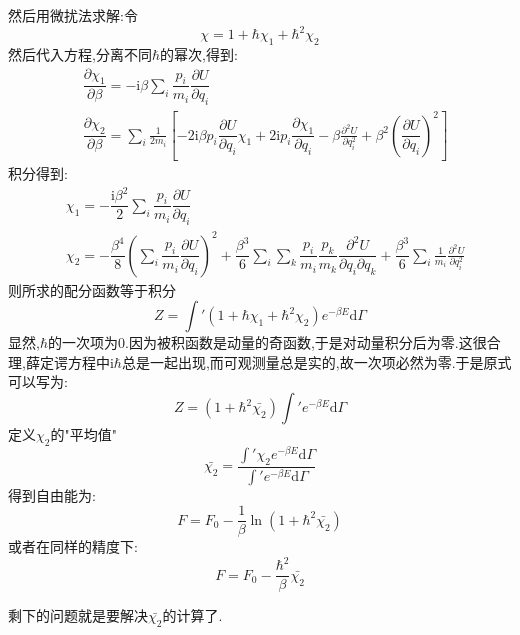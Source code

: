 然后用微扰法求解:令
\begin{equation}
  \chi=1+\hbar\chi_1+\hbar^{2}\chi_2
\end{equation}
然后代入方程,分离不同$\hbar$的幂次,得到:
\begin{align}
&\dfrac{\partial \chi_1}{\partial \beta}=-\mathrm{i} \beta\sum_i \dfrac{p_i}{m_i}\dfrac{\partial U}{\partial q_i} \\ 
&\dfrac{\partial \chi_2}{\partial \beta}=\sum_i \frac{1}{2m_i}\left[ -2\mathrm{i} \beta p_i \dfrac{\partial U}{\partial q_i}\chi_1+2\mathrm{i} p_i \dfrac{\partial \chi_1}{\partial q_i}-\beta \frac{\partial^2 U}{\partial q_i^2}+\beta^{2} \left( \dfrac{\partial U}{\partial q_i} \right) ^{2} \right]
\end{align}
积分得到:
\begin{align}
&\chi_1=-\dfrac{\mathrm{i} \beta^{2}}{2}\sum_i \dfrac{p_i}{m_i}\dfrac{\partial U}{\partial q_i} \\ 
&\chi_2=-\dfrac{\beta^{4}}{8}\left( \sum_i \dfrac{p_i}{m_i}\dfrac{\partial U}{\partial q_i}
 \right) ^{2}+\dfrac{\beta^{3}}{6}\sum_i \sum_k \dfrac{p_i}{m_i}\dfrac{p_k}{m_k}\dfrac{\partial^{2} U}{\partial q_i \partial q_k}+\dfrac{\beta^{3}}{6}\sum_i \frac{1}{m_i} \frac{\partial^2 U}{\partial q_i^2}
\end{align}
则所求的配分函数等于积分
\begin{equation}
  Z=\int'(1+\hbar \chi_1+\hbar^{2}\chi_2)e^{-\beta E}\mathrm{d} \Gamma
\end{equation}
显然,$\hbar$的一次项为0.因为被积函数是动量的奇函数,于是对动量积分后为零.这很合理,薛定谔方程中$\mathrm{i} \hbar$总是一起出现,而可观测量总是实的,故一次项必然为零.于是原式可以写为:
\begin{equation}
  Z=(1+\hbar^{2}\bar{\chi_2})\int' e^{-\beta E}\mathrm{d} \Gamma
\end{equation}
定义$\chi_2$的"平均值"
\[\bar{\chi_2}=\dfrac{\int'\chi_2 e^{-\beta E}\mathrm{d} \Gamma}{\int' e^{-\beta E}\mathrm{d} \Gamma}\]
得到自由能为:
\begin{equation}
  F=F_0-\frac{1}{\beta}\ln(1+\hbar^{2}\bar{\chi_2})
\end{equation}
或者在同样的精度下:
\begin{equation}
  F=F_0-\dfrac{\hbar^{2}}{\beta}\bar{\chi_2}\label{eq:3.13}
\end{equation}

\vspace*{0.5cm}

剩下的问题就是要解决$\bar{\chi_2}$的计算了.

